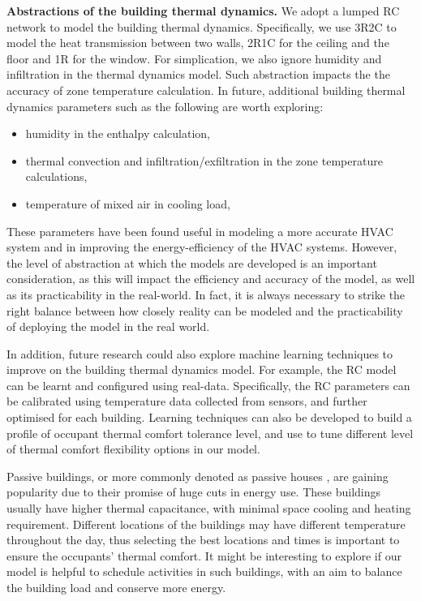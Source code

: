 \textbf{Abstractions of the building thermal dynamics.} We adopt a lumped RC network to model the building thermal dynamics. Specifically, we use 3R2C to model the heat transmission between two walls, 2R1C for the ceiling and the floor and 1R for the window. For simplication, we also ignore humidity and infiltration in the thermal dynamics model. Such abstraction impacts the the accuracy of zone temperature calculation. In future, additional building thermal dynamics parameters such as the following are worth exploring: 
\begin{itemize}
	\item humidity in the enthalpy calculation,	
	\item thermal convection and infiltration/exfiltration in the zone temperature calculations,	
	\item temperature of mixed air in cooling load,		
\end{itemize}
These parameters have been found useful in modeling a more accurate HVAC system and in improving the energy-efficiency of the HVAC systems. However, the level of abstraction at which the models are developed is an important consideration, as this will impact the efficiency and accuracy of the model, as well as its practicability in the real-world. In fact, it is always necessary to strike the right balance between how closely reality can be modeled and the practicability of deploying the model in the real world.

In addition, future research could also explore machine learning techniques to improve on the building thermal dynamics model. For example, the RC model can be learnt and configured using real-data. Specifically, the RC parameters can be calibrated using temperature data collected from sensors, and further optimised for each building. Learning techniques can also be developed to build a profile of occupant thermal comfort tolerance level, and use to tune different level of thermal comfort flexibility options in our model.

Passive buildings, or more commonly denoted as passive houses \citep{henze2004evaluation,sadineni2011passive}, are gaining popularity due to their promise of huge cuts in energy use. These buildings usually have higher thermal capacitance, with minimal space cooling and heating requirement. Different locations of the buildings may have different temperature throughout the day, thus selecting the best locations and times is important to ensure the occupants' thermal comfort. It might be interesting to explore if our model is helpful to schedule activities in such buildings, with an aim to balance the building load and conserve more energy.

